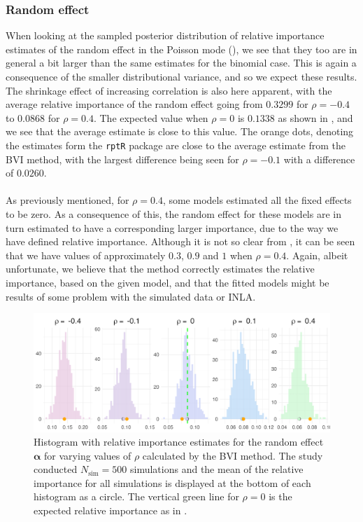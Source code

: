 \subsubsection{Random effect}
When looking at the sampled posterior distribution of relative importance estimates of the random effect in the Poisson mode (), we see that they too are in general a bit larger than the same estimates for the binomial case. This is again a consequence of the smaller distributional variance, and so we expect these results. The shrinkage effect of increasing correlation is also here apparent, with the average relative importance of the random effect going from $0.3299$ for $\rho=-0.4$ to $0.0868$ for $\rho=0.4$. The expected value when $\rho=0$ is $0.1338$ as shown in , and we see that the average estimate is close to this value. The orange dots, denoting the estimates form the \texttt{rptR} package are close to the average estimate from the BVI method, with the largest difference being seen for $\rho=-0.1$ with a difference of $0.0260$.
\\
\\
As previously mentioned, for $\rho=0.4$, some models estimated all the fixed effects to be zero. As a consequence of this, the random effect for these models are in turn estimated to have a corresponding larger importance,  due to the way we have defined relative importance. Although it is not so clear from , it can be seen that we have values of approximately $0.3$, $0.9$ and $1$ when $\rho=0.4$. Again, albeit unfortunate, we believe that the method correctly estimates the relative importance, based on the given model, and that the fitted models might be results of some problem with the simulated data or INLA.
\begin{figure}[H]
  \centering
    \includegraphics[width=1\linewidth]{Figures/Simulation study/Random_poisson.png}
    \caption[Relative importance of the random effect $\boldsymbol{\alpha}$ in Poisson GLMM]{Histogram with relative importance estimates for the random effect $\boldsymbol{\alpha}$ for varying values of $\rho$ calculated by the BVI method. The study conducted $N_{\text{sim}}=500$ simulations and the mean of the relative importance for all simulations is displayed at the bottom of each histogram as a circle. The vertical green line for $\rho=0$ is the expected relative importance as in .}
    \label{fig:relimp_random_poisson}
\end{figure}
